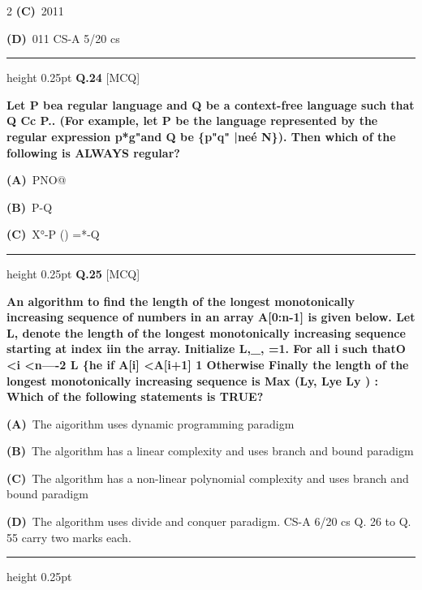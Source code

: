 \documentclass[a4paper,10pt,twoside]{article}
\begin{document}
\begin{multicols}{2}
\textbf{(C)}~2011\par\vspace{2pt}\noindent
\textbf{(D)}~011 \newline CS-A 5/20  cs
\par\vspace{6pt}\hrule height 0.25pt\vspace{6pt}
\noindent\textbf{Q.24} \hfill {\footnotesize\textsf{[MCQ]}}
\par\vspace{2pt}
{\bfseries Let P bea regular language and Q be a context-free language such that Q Cc P.. (For example, let
P be the language represented by the regular expression p*g"and Q be \{p"q" |neé N\}). Then
which of the following is ALWAYS regular? \par}
\par\vspace{2pt}\noindent
\textbf{(A)}~PNO@\par\vspace{2pt}\noindent
\textbf{(B)}~P-Q\par\vspace{2pt}\noindent
\textbf{(C)}~X°-P () =*-Q
\par\vspace{6pt}\hrule height 0.25pt\vspace{6pt}
\noindent\textbf{Q.25} \hfill {\footnotesize\textsf{[MCQ]}}
\par\vspace{2pt}
{\bfseries An algorithm to find the length of the longest monotonically increasing sequence of numbers in an
array A[0:n-1] is given below.
Let L, denote the length of the longest monotonically increasing sequence starting at index iin
the array.
Initialize L,\_, =1.
For all i such thatO <i <n----2
L \{he if A[i] <A[i+1]
1 Otherwise
Finally the length of the longest monotonically increasing sequence is Max (Ly, Lye Ly ) :
Which of the following statements is TRUE? \par}
\par\vspace{2pt}\noindent
\textbf{(A)}~The aigorithm uses dynamic programming paradigm\par\vspace{2pt}\noindent
\textbf{(B)}~The algorithm has a linear complexity and uses branch and bound paradigm\par\vspace{2pt}\noindent
\textbf{(C)}~The algorithm has a non-linear polynomial complexity and uses branch and bound paradigm\par\vspace{2pt}\noindent
\textbf{(D)}~The algorithm uses divide and conquer paradigm. \newline CS-A 6/20  cs \newline Q. 26 to Q. 55 carry two marks each.
\par\vspace{6pt}\hrule height 0.25pt\vspace{6pt}


\end{multicols}
\end{document}
